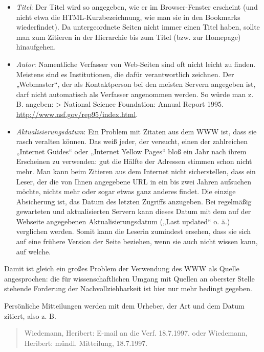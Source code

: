 \documentclass[]{book}
\providecommand{\tightlist}{%
  \setlength{\itemsep}{0pt}\setlength{\parskip}{0pt}}
\theoremstyle{definition}
\theoremstyle{definition}
\theoremstyle{definition}
\theoremstyle{remark}
\begin{document}
\begin{itemize}
\tightlist
\item
  \emph{Titel}: Der Titel wird so angegeben, wie er im Browser-Fenster
  erscheint (und nicht etwa die HTML-Kurzbezeichnung, wie man sie in den
  Bookmarks wiederfindet). Da untergeordnete Seiten nicht immer einen
  Titel haben, sollte man zum Zitieren in der Hierarchie bis zum Titel
  (bzw. zur Homepage) hinaufgehen.
\item
  \emph{Autor}: Namentliche Verfasser von Web-Seiten sind oft nicht
  leicht zu finden. Meistens sind es Institutionen, die dafür
  verantwortlich zeichnen. Der „Webmaster``, der als Kontaktperson bei
  den meisten Servern angegeben ist, darf nicht automatisch als
  Verfasser angenommen werden. So würde man z. B. angeben:
  \textgreater{} National Science Foundation: Annual Report 1995.
  \url{http://www.nsf.gov/rep95/index.html}.
\item
  \emph{Aktualisierungsdatum}: Ein Problem mit Zitaten aus dem WWW ist,
  dass sie rasch veralten können. Das weiß jeder, der versucht, einen
  der zahlreichen „Internet Guides`` oder „Internet Yellow Pages`` bloß
  ein Jahr nach ihrem Erscheinen zu verwenden: gut die Hälfte der
  Adressen stimmen schon nicht mehr. Man kann beim Zitieren aus dem
  Internet nicht sicherstellen, dass ein Leser, der die von Ihnen
  angegebene URL in ein bis zwei Jahren aufsuchen möchte, nichts mehr
  oder sogar etwas ganz anderes findet. Die einzige Absicherung ist, das
  Datum des letzten Zugriffs anzugeben. Bei regelmäßig gewarteten und
  aktualisierten Servern kann dieses Datum mit dem auf der Webseite
  angegebenen Aktualisierungsdatum („Last updated`` o. ä.) verglichen
  werden. Somit kann die Leserin zumindest ersehen, dass sie sich auf
  eine frühere Version der Seite beziehen, wenn sie auch nicht wissen
  kann, auf welche.
\end{itemize}

Damit ist gleich ein großes Problem der Verwendung des WWW als Quelle
angesprochen: die für wissenschaftlichen Umgang mit Quellen an oberster
Stelle stehende Forderung der Nachvollziehbarkeit ist hier nur mehr
bedingt gegeben.

Persönliche Mitteilungen werden mit dem Urheber, der Art und dem Datum
zitiert, also z. B.

\begin{quote}
Wiedemann, Heribert: E-mail an die Verf. 18.7.1997. oder Wiedemann,
Heribert: mündl. Mitteilung, 18.7.1997.
\end{quote}
\end{document}
